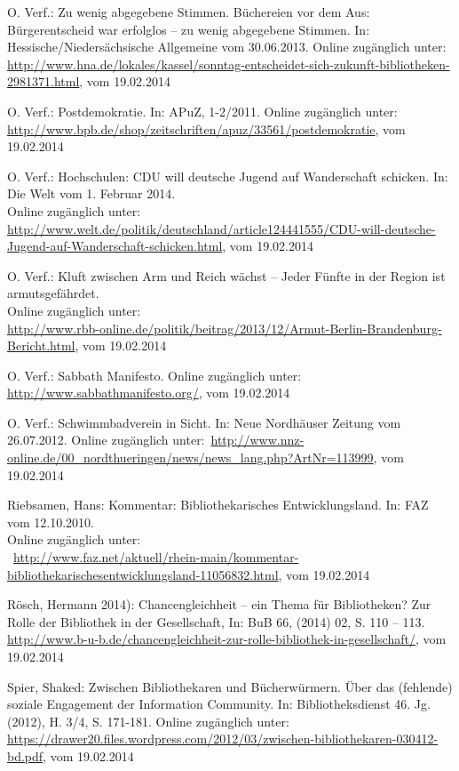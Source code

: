 \documentclass[a4paper,
fontsize=11pt,
oneside,
numbers=noperiodatend,
parskip=half-,
bibliography=totoc,
final
]{scrartcl}
\begin{document}
O. Verf.: Zu wenig abgegebene Stimmen. Büchereien vor dem Aus:
Bürgerentscheid war erfolglos -- zu wenig abgegebene Stimmen. In:
Hessische/Niedersächsische Allgemeine vom 30.06.2013. Online zugänglich
unter:
\url{http://www.hna.de/lokales/kassel/sonntag-entscheidet-sich-zukunft-bibliotheken-2981371.html},
vom 19.02.2014

O. Verf.: Postdemokratie. In: APuZ, 1-2/2011. Online zugänglich unter:~
\url{http://www.bpb.de/shop/zeitschriften/apuz/33561/postdemokratie},
vom 19.02.2014

O. Verf.: Hochschulen: CDU will deutsche Jugend auf Wanderschaft
schicken. In: Die Welt vom 1. Februar 2014. \\ Online zugänglich unter:~
\url{http://www.welt.de/politik/deutschland/article124441555/CDU-will-deutsche-Jugend-auf-Wanderschaft-schicken.html},
vom 19.02.2014

O. Verf.: Kluft zwischen Arm und Reich wächst -- Jeder Fünfte in der
Region ist armutsgefährdet. \\ Online zugänglich
unter: \\ \url{http://www.rbb-online.de/politik/beitrag/2013/12/Armut-Berlin-Brandenburg-Bericht.html},
vom 19.02.2014

O. Verf.: Sabbath Manifesto. Online zugänglich unter:~
\url{http://www.sabbathmanifesto.org/}, vom 19.02.2014

O. Verf.: Schwimmbadverein in Sicht. In: Neue Nordhäuser Zeitung vom
26.07.2012. Online zugänglich
unter:~\url{http://www.nnz-online.de/00\_nordthueringen/news/news_lang.php?ArtNr=113999},
vom 19.02.2014

Riebsamen, Hans: Kommentar: Bibliothekarisches Entwicklungsland. In: FAZ
vom 12.10.2010. \\ Online zugänglich
unter: \\ ~\url{http://www.faz.net/aktuell/rhein-main/kommentar-bibliothekarischesentwicklungsland-11056832.html},
vom 19.02.2014

Rösch, Hermann 2014): Chancengleichheit -- ein Thema für Bibliotheken?
Zur Rolle der Bibliothek in der Gesellschaft, In: BuB 66, (2014) 02, S.
110 -- 113. \\
\url{http://www.b-u-b.de/chancengleichheit-zur-rolle-bibliothek-in-gesellschaft/},
vom 19.02.2014

Spier, Shaked: Zwischen Bibliothekaren und Bücherwürmern. Über das
(fehlende) soziale Engagement der Information Community. In:
Bibliotheksdienst 46. Jg. (2012), H. 3/4, S. 171-181. Online zugänglich
unter:~
\url{https://drawer20.files.wordpress.com/2012/03/zwischen-bibliothekaren-030412-bd.pdf},
vom 19.02.2014
\end{document}

